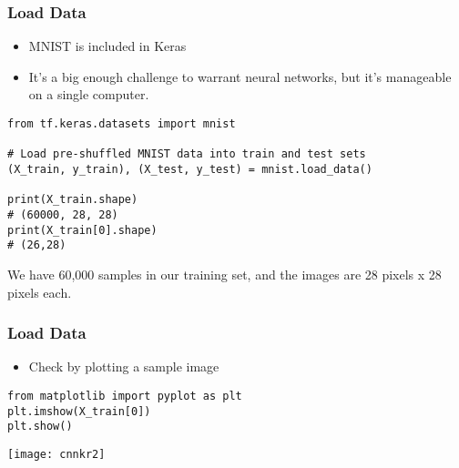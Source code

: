 \begin{frame}[fragile] \frametitle{Load Data}

\begin{itemize}
\item MNIST is included in Keras
\item It's a big enough challenge to warrant neural networks, but it's manageable on a single computer. 
\end{itemize}
\begin{lstlisting}
from tf.keras.datasets import mnist
 
# Load pre-shuffled MNIST data into train and test sets
(X_train, y_train), (X_test, y_test) = mnist.load_data()

print(X_train.shape)
# (60000, 28, 28)
print(X_train[0].shape)
# (26,28)
\end{lstlisting}
We have 60,000 samples in our training set, and the images are 28 pixels x 28 pixels each.
\end{frame}

\begin{frame}[fragile] \frametitle{Load Data}

\begin{itemize}
\item Check by plotting a sample image
\end{itemize}
\begin{lstlisting}
from matplotlib import pyplot as plt
plt.imshow(X_train[0])
plt.show()
\end{lstlisting}
\begin{center}
\texttt{[image: cnnkr2]}
\end{center}
\end{frame}





